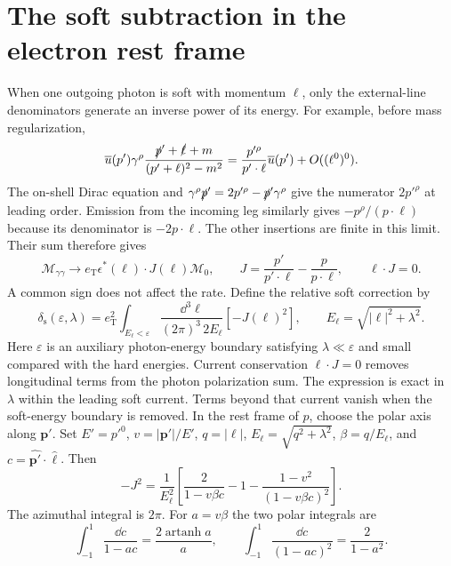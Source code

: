 \section{The soft subtraction in the electron rest frame}
When one outgoing photon is soft with momentum $\ell$, only the
external-line denominators generate an inverse power of its energy.
For example, before mass regularization,
\begin{equation}
 \overline u(p')\gamma^\rho
 \frac{\slashed p'+\slashed\ell+m}{(p'+\ell)^2-m^2}
 =\frac{p'^\rho}{p'\cdot\ell}\overline u(p')+O((\ell^0)^0).
\end{equation}
The on-shell Dirac equation and
$\gamma^\rho\slashed p'=2p'^\rho-\slashed p'\gamma^\rho$
give the numerator $2p'^\rho$ at leading order. Emission from the
incoming leg similarly gives $-p^\rho/(p\cdot\ell)$ because its
denominator is $-2p\cdot\ell$. The other insertions are finite in
this limit. Their sum therefore gives
\begin{equation}
 \mathcal M_{\gamma\gamma}\longrightarrow
 e_{\mathrm T}\epsilon^*(\ell)\cdot J(\ell)\mathcal M_0,
 \qquad J=\frac{p'}{p'\cdot\ell}-\frac{p}{p\cdot\ell},
 \qquad \ell\cdot J=0.
\end{equation}
A common sign does not affect the rate. Define the relative soft
correction by
\begin{equation}
 \delta_{\mathrm s}(\varepsilon,\lambda)
 =e_{\mathrm T}^2\int_{E_\ell<\varepsilon}
 \frac{\dd^3\bm\ell}{(2\pi)^3\,2E_\ell}[-J(\ell)^2],
 \qquad E_\ell=\sqrt{|\bm\ell|^2+\lambda^2}.
\end{equation}
Here $\varepsilon$ is an auxiliary photon-energy boundary satisfying
$\lambda\ll\varepsilon$ and small compared with the hard energies.
Current conservation $\ell\cdot J=0$ removes longitudinal terms
from the photon polarization sum. The expression is exact in
$\lambda$ within the leading soft current. Terms beyond that current
vanish when the soft-energy boundary is removed.
In the rest frame of $p$,
choose the polar axis along $\bm p'$. Set
$E'=p'^0$, $v=|\bm p'|/E'$, $q=|\bm\ell|$,
$E_\ell=\sqrt{q^2+\lambda^2}$, $\beta=q/E_\ell$, and
$c=\widehat{\bm p'}\cdot\widehat{\bm\ell}$. Then
\begin{equation}
 -J^2=\frac1{E_\ell^2}
 \left[\frac2{1-v\beta c}-1
                  -\frac{1-v^2}{(1-v\beta c)^2}\right].
\end{equation}
The azimuthal integral is $2\pi$. For $a=v\beta$ the two polar
integrals are
\begin{equation}
 \int_{-1}^1\frac{\dd c}{1-ac}
 =\frac{2\operatorname{artanh}a}{a},\qquad
 \int_{-1}^1\frac{\dd c}{(1-ac)^2}=\frac{2}{1-a^2}.
\end{equation}
